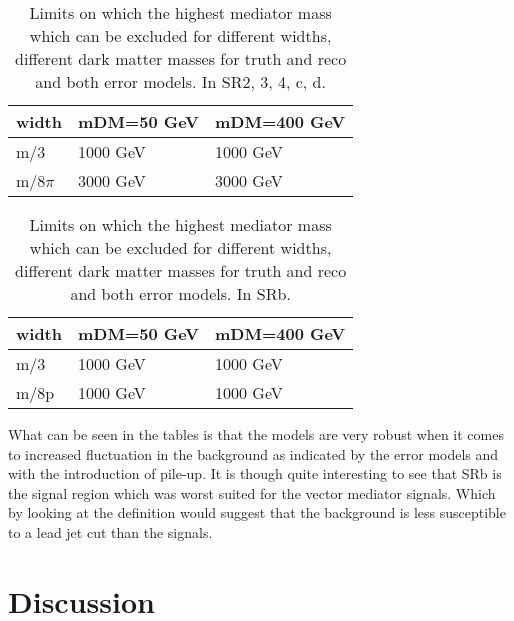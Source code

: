 \begin{table}[ht]
\begin{center}
\begin{tabular}{|l|l|l|}
\hline
width & mDM=50 GeV & mDM=400 GeV \\ \hline
m/3 & 1000 GeV & 1000 GeV \\ \hline
m/$8\pi$ & 3000 GeV & 3000 GeV\\ \hline
\end{tabular}
\caption{Limits on which the highest mediator mass which can be excluded for different widths, different dark matter masses for truth and reco and both error models. In SR2, 3, 4, c, d.}
\label{tab:mediatorpass}
\end{center}
\end{table}
\begin{table}[ht]
\begin{center}
\begin{tabular}{|l|l|l|}
\hline
width & mDM=50 GeV & mDM=400 GeV \\ \hline
m/3 & 1000 GeV & 1000 GeV\\ \hline
m/8p & 1000 GeV & 1000 GeV\\ \hline
\end{tabular}
\caption{Limits on which the highest mediator mass which can be excluded for different widths, different dark matter masses for truth and reco and both error models. In SRb.}
\label{tab:mediatorpass2}
\end{center}
\end{table}

What can be seen in the tables is that the models are very robust when it comes to increased fluctuation in the background as indicated by the error models and with the introduction of pile-up. It is though quite interesting to see that SRb is the signal region which was worst suited for the vector mediator signals. Which by looking at the definition would suggest that the background is less susceptible to a lead jet cut than the signals.

\newpage
\section{Discussion}
